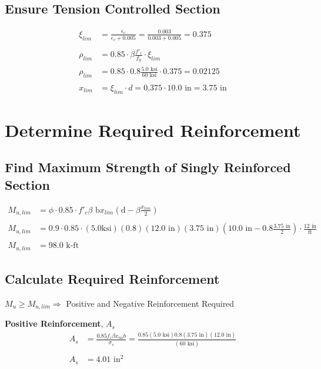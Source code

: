 \documentclass{article}%
\begin{document}
%
\subsection{Ensure Tension Controlled Section}%
\label{subsec:Ensure Tension Controlled Section}%
\begin{align*} \xi_{lim} &= \frac{\epsilon_c}{\epsilon_c + 0.005} = \frac{0.003}{0.003 + 0.005} = 0.375 \\\\ \rho_{lim} &= 0.85 \cdot \beta \frac{f'_c}{f_y} \cdot \xi_{lim} \\ \rho_{lim} &= 0.85 \cdot 0.8 \frac{5.0 \text{ ksi}}{60 \text{ ksi}} \cdot 0.375 = 0.02125 \\\\ x_{lim} &= \xi_{lim} \cdot d = 0.375 \cdot 10.0 \text{ in} = 3.75 \text{ in}\end{align*}

%
\newpage%
\section{Determine Required Reinforcement}%
\label{sec:Determine Required Reinforcement}%
\subsection{Find Maximum Strength of Singly Reinforced Section}%
\label{subsec:Find Maximum Strength of Singly Reinforced Section}%
\begin{align*}M_{u, lim} &= \phi \cdot 0.85 \cdot f'_c \beta \text{ b} x_{lim}\left(\text{d} - \beta \frac{x_{lim}}{2}\right) \\\\M_{u, lim} &= 0.9 \cdot 0.85 \cdot (5.0 \text{ksi})(0.8)(12.0 \text{ in})(3.75 \text{ in})\left(10.0 \text{ in} - 0.8 \frac{3.75 \text{ in}}{2}\right) \cdot \frac{12 \text{ in}}{\text{ft}}\\\\M_{u, lim} &= 98.0 \text { k-ft}\end{align*}

%
\subsection{Calculate Required Reinforcement}%
\label{subsec:Calculate Required Reinforcement}%
$M_u \geq M_{u,lim} \Rightarrow$ Positive and Negative Reinforcement Required 
%

 \textbf{Positive Reinforcement}, $A_s$%
\begin{align*}A_s &= \frac{0.85 f_c \beta x_{na} b}{\sigma_s} =\frac{0.85 (5.0 \text{ ksi}) 0.8 (3.75  \text{ in})(12.0 \text{ in})}{(60 \text{ ksi})} \\\\A_s &= 4.01 \text{ in}^2\end{align*}%
\end{document}
